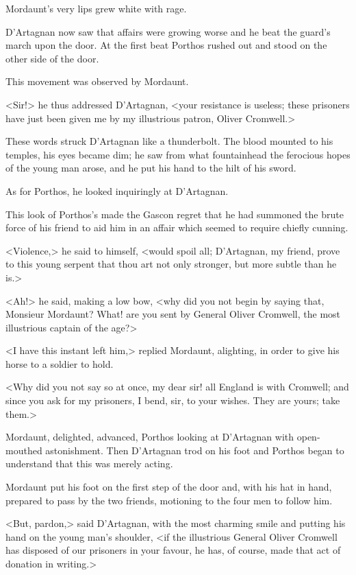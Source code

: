 Mordaunt's very lips grew white with rage.

D'Artagnan now saw that affairs were growing worse and he beat the guard's march upon the door. At the first beat Porthos rushed out and stood on the other side of the door.

This movement was observed by Mordaunt.

<Sir!> he thus addressed D'Artagnan, <your resistance is useless; these prisoners have just been given me by my illustrious patron, Oliver Cromwell.>

These words struck D'Artagnan like a thunderbolt. The blood mounted to his temples, his eyes became dim; he saw from what fountainhead the ferocious hopes of the young man arose, and he put his hand to the hilt of his sword.

As for Porthos, he looked inquiringly at D'Artagnan.

This look of Porthos's made the Gascon regret that he had summoned the brute force of his friend to aid him in an affair which seemed to require chiefly cunning.

<Violence,> he said to himself, <would spoil all; D'Artagnan, my friend, prove to this young serpent that thou art not only stronger, but more subtle than he is.>

<Ah!> he said, making a low bow, <why did you not begin by saying that, Monsieur Mordaunt? What! are you sent by General Oliver Cromwell, the most illustrious captain of the age?>

<I have this instant left him,> replied Mordaunt, alighting, in order to give his horse to a soldier to hold.

<Why did you not say so at once, my dear sir! all England is with Cromwell; and since you ask for my prisoners, I bend, sir, to your wishes. They are yours; take them.>

Mordaunt, delighted, advanced, Porthos looking at D'Artagnan with open-mouthed astonishment. Then D'Artagnan trod on his foot and Porthos began to understand that this was merely acting.

Mordaunt put his foot on the first step of the door and, with his hat in hand, prepared to pass by the two friends, motioning to the four men to follow him.

<But, pardon,> said D'Artagnan, with the most charming smile and putting his hand on the young man's shoulder, <if the illustrious General Oliver Cromwell has disposed of our prisoners in your favour, he has, of course, made that act of donation in writing.>

